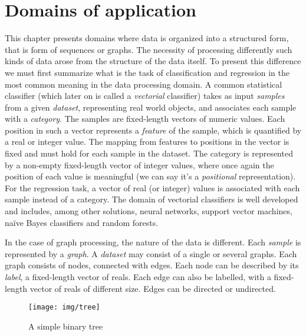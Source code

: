 
\chapter{Domains of application\label{chap:domains}}
This chapter presents domains where data is organized into a structured form, that is form of sequences or graphs. The necessity of processing differently such kinds of data arose from the structure of the data itself. To present this difference we must first summarize what is the task of classification and regression in the most common meaning in the data processing domain. A common statistical classifier (which later on is called a \emph{vectorial} classifier) takes as input \emph{samples} from a given \emph{dataset}, representing real world objects, and associates each sample with a \emph{category}. The samples are fixed-length vectors of numeric values. Each position in such a vector represents a \emph{feature} of the sample, which is quantified by a real or integer value. The mapping from features to positions in the vector is fixed and must hold for each sample in the dataset. The category is represented by a non-empty fixed-length vector of integer values, where once again the position of each value is meaningful (we can say it's a \emph{positional} representation). For the regression task, a vector of real (or integer) values is associated with each sample instead of a category. The domain of vectorial classifiers is well developed and includes, among other solutions, neural networks, support vector machines, naïve Bayes classifiers and random forests.

In the case of graph processing, the nature of the data is different. Each \emph{sample} is represented by a \emph{graph}. A \emph{dataset} may consist of a single or several graphs. Each graph consists of nodes, connected with edges. Each node can be described by its \emph{label}, a fixed-length vector of reals. Each edge can also be labelled, with a fixed-length vector of reals of different size. Edges can be directed or undirected.

\begin{figure}
\begin{center}
	\texttt{[image: img/tree]}
	\caption{A simple binary tree}
	\label{fig:simple_tree}
\end{center}
\end{figure}

